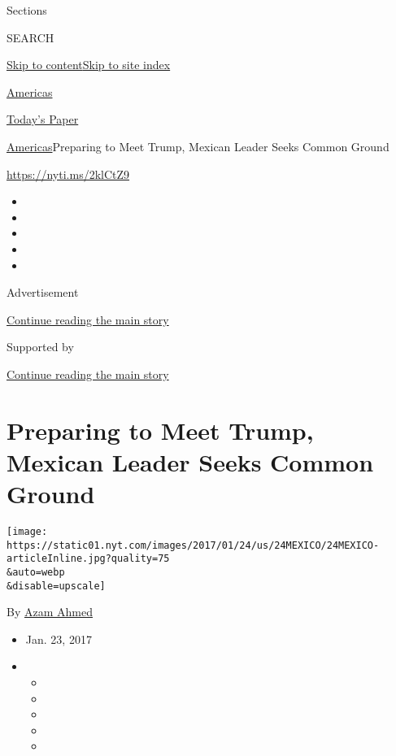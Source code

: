 Sections

SEARCH

\protect\hyperlink{site-content}{Skip to
content}\protect\hyperlink{site-index}{Skip to site index}

\href{https://www.nytimes.com/section/world/americas}{Americas}

\href{https://myaccount.nytimes.com/auth/login?response_type=cookie\&client_id=vi}{}

\href{https://www.nytimes.com/section/todayspaper}{Today's Paper}

\href{/section/world/americas}{Americas}\textbar{}Preparing to Meet
Trump, Mexican Leader Seeks Common Ground

\url{https://nyti.ms/2klCtZ9}

\begin{itemize}
\item
\item
\item
\item
\item
\end{itemize}

Advertisement

\protect\hyperlink{after-top}{Continue reading the main story}

Supported by

\protect\hyperlink{after-sponsor}{Continue reading the main story}

\hypertarget{preparing-to-meet-trump-mexican-leader-seeks-common-ground}{%
\section{Preparing to Meet Trump, Mexican Leader Seeks Common
Ground}\label{preparing-to-meet-trump-mexican-leader-seeks-common-ground}}

\texttt{[image: https://static01.nyt.com/images/2017/01/24/us/24MEXICO/24MEXICO-articleInline.jpg?quality=75\\\&auto=webp\\\&disable=upscale]}

By \href{http://www.nytimes.com/by/azam-ahmed}{Azam Ahmed}

\begin{itemize}
\item
  Jan. 23, 2017
\item
  \begin{itemize}
  \item
  \item
  \item
  \item
  \item
  \end{itemize}
\end{itemize}

